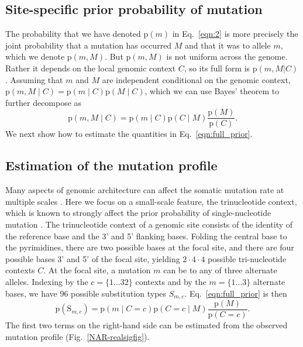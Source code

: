 \documentclass[a4,center,fleqn]{NAR}
\begin{document}
\subsection{Site-specific prior probability of mutation}
The probability that we have denoted $\mathrm{p}(m)$ in Eq.~\ref{eqn:2} is more precisely the joint probability that a mutation has occurred $M$ and that it was to allele $m$, which we denote $\mathrm{p}(m,M)$.
But $\mathrm{p}(m,M)$ is not uniform across the genome.
Rather it depends on the local genomic context $C$, so its full form is $\mathrm{p}(m,M | C)$ \cite{Buisson2019}.
Assuming that $m$ and $M$ are independent conditional on the genomic context, $\mathrm{p}(m,M \mid C) = \mathrm{p}(m \mid C) \mathrm{p}(M \mid C)$, which we can use Bayes' theorem to further decompose as 
\begin{equation}
  \label{eqn:full_prior}
  \mathrm{p}(m,M \mid C) = \mathrm{p}(m \mid C) \mathrm{p}(C \mid M)\frac{\mathrm{p}(M)}{\mathrm{p}(C)}.
\end{equation}
We next show how to estimate the quantities in Eq.~\ref{eqn:full_prior}.

\subsection{Estimation of the mutation profile}
Many aspects of genomic architecture can affect the somatic mutation rate at multiple scales \cite{Buisson2019}.
Here we focus on a small-scale feature, the trinucleotide context, which is known to strongly affect the prior probability of single-nucleotide mutation \cite{Nik-Zainal2012a,Alexandrov2015,Lee-Six2018}.
The trinucleotide context of a genomic site consists of the identity of the reference base and the 3' and 5' flanking bases.
Folding the central base to the pyrimidines, there are two possible bases at the focal site, and there are four possible bases 3' and 5' of the focal site, yielding $2 \cdot 4 \cdot 4$ possible tri-nucleotide contexts $C$.
At the focal site, a mutation $m$ can be to any of three alternate alleles.
Indexing by the $c=\{1 \dots 32\}$ contexts and by the $m = \{1 \dots 3\}$ alternate bases, we have 96 possible substitution types $S_{m,c}$.
Eq.~\ref{eqn:full_prior} is then
\begin{equation}
  \label{eqn:detailed_prior}
  \mathrm{p}(\mathrm{S}_{m,c}) = \mathrm{p}(m \mid C = c) \mathrm{p}(C = c \mid M)\frac{\mathrm{p}(M)}{\mathrm{p}(C = c)}.
\end{equation}
The first two terms on the right-hand side can be estimated from the observed mutation profile (Fig.~\ref{NAR-realsigfig}).
\end{document}
